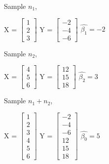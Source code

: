 \documentclass[12pt]{article}
\begin{document}
\noindent Sample $n_1$,
\vspace{3mm}

\begin{center}

X = $
\begin{bmatrix}
1\\2\\3
\end{bmatrix}
$
\hspace{2mm} Y = $
\begin{bmatrix}
-2\\-4\\-6
\end{bmatrix}
$
\hspace{2mm} $\hat{\beta_1} =  -2$
\end{center}

\vspace{3mm}

\noindent Sample $n_2$,
\vspace{3mm}

\begin{center}

X = $
\begin{bmatrix}
4\\5\\6
\end{bmatrix}
$
\hspace{2mm} Y = $
\begin{bmatrix}
12\\15\\18
\end{bmatrix}
$
\hspace{2mm} $\hat{\beta_2} =  3$
\end{center}

\vspace{3mm}

\noindent Sample $n_1+n_2$,
\vspace{3mm}

\begin{center}

X = $
\begin{bmatrix}
1\\2\\3\\4\\5\\6
\end{bmatrix}
$
\hspace{2mm} Y = $
\begin{bmatrix}
-2\\-4\\-6\\12\\15\\18
\end{bmatrix}
$
\hspace{2mm} $\hat{\beta_0} =  5$
\end{center}
\end{document}
